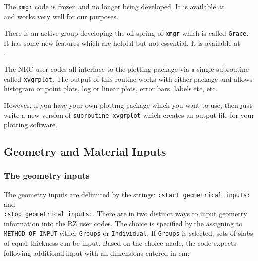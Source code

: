 \documentclass[12pt,twoside]{article}  %
\begin{document}
The {\tt xmgr} code is frozen and no longer being developed. It is
available at\\ 
and works very well for our purposes.

There is an active group developing the off-spring of {\tt xmgr} which is
called {\tt Grace}. It has some new features which are helpful but not
essential. It is available at\\ .

The NRC user codes all interface to the plotting package via a single
subroutine called {\tt xvgrplot}. The output of this routine works with either
package and allows histogram or point plots, log or linear plots, error
bars, labels etc, etc.

However, if you have your own plotting package which you want to use, then
just write a new version of {\tt subroutine xvgrplot} which creates an
output file for your plotting software.

\subsection{Geometry and Material Inputs}

\subsubsection{The geometry inputs}
\label{geomsect}

 
The geometry inputs are delimited by the strings:
\verb+:start geometrical inputs:+ and \\
\verb+:stop geometrical inputs:+.
There are in two distinct ways to input geometry information into the RZ
user codes. The choice is specified by the assigning to \verb+METHOD OF INPUT+
either \verb+Groups+ or \verb+Individual+. If \verb+Groups+
is selected, sets of slabs of equal thickness can be input.
Based on the choice made, the code expects following additional input
with all dimensions entered in cm:
\end{document}
